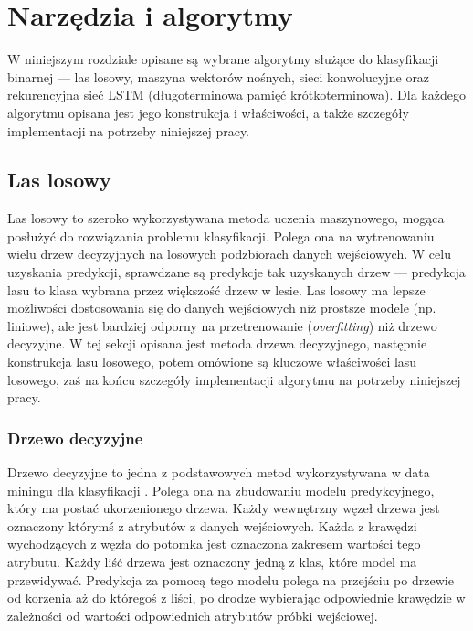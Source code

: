 \chapter{Narzędzia i algorytmy}
\label{chapter:2}

W niniejszym rozdziale opisane są wybrane algorytmy służące do klasyfikacji binarnej --- las losowy, maszyna wektorów nośnych, sieci konwolucyjne oraz rekurencyjna sieć LSTM (długoterminowa pamięć krótkoterminowa). Dla każdego algorytmu opisana jest jego konstrukcja i właściwości, a także szczegóły implementacji na potrzeby niniejszej pracy.

\section{Las losowy}
\label{sec:rf}

Las losowy to szeroko wykorzystywana metoda uczenia maszynowego, mogąca posłużyć do rozwiązania problemu klasyfikacji. Polega ona na wytrenowaniu wielu drzew decyzyjnych na losowych podzbiorach danych wejściowych. W celu uzyskania predykcji, sprawdzane są predykcje tak uzyskanych drzew --- predykcja lasu to klasa wybrana przez większość drzew w lesie. Las losowy ma lepsze możliwości dostosowania się do danych wejściowych niż prostsze modele (np. liniowe), ale jest bardziej odporny na przetrenowanie (\textit{overfitting}) niż drzewo decyzyjne.
W tej sekcji opisana jest metoda drzewa decyzyjnego, następnie konstrukcja lasu losowego, potem omówione są kluczowe właściwości lasu losowego, zaś na końcu szczegóły implementacji algorytmu na potrzeby niniejszej pracy.

\subsection{Drzewo decyzyjne}
\label{subsec:dt}

Drzewo decyzyjne to jedna z podstawowych metod wykorzystywana w data miningu dla klasyfikacji \cite{rokach2007data}. Polega ona na zbudowaniu modelu predykcyjnego, który ma postać ukorzenionego drzewa. Każdy wewnętrzny węzeł drzewa jest oznaczony którymś z atrybutów z danych wejściowych. Każda z krawędzi wychodzących z węzła do potomka jest oznaczona zakresem wartości tego atrybutu. Każdy liść drzewa jest oznaczony jedną z klas, które model ma przewidywać. Predykcja za pomocą tego modelu polega na przejściu po drzewie od korzenia aż do któregoś z liści, po drodze wybierając odpowiednie krawędzie w zależności od wartości odpowiednich atrybutów próbki wejściowej.

